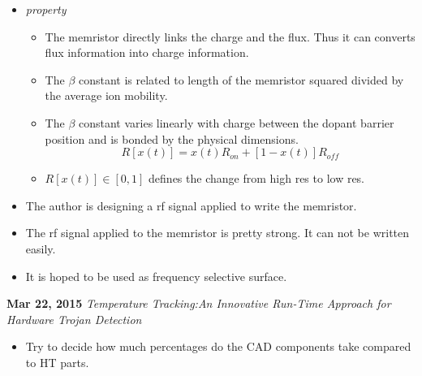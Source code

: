 \documentclass[]{article}
\begin{document}
\indent		\begin{itemize}
        \item \textit{property} 
            \begin{itemize}
                \item The memristor directly links the charge and the flux. Thus it can
                converts flux information into charge information.             
                \item The $\beta$ constant is related to length of the memristor squared
                divided by the average ion mobility.
                \item The $\beta$ constant varies linearly with charge between the
                dopant barrier position and is bonded by the physical dimensions.
                \begin{equation}
                    R[x(t)] = x(t)R_{on}+[1-x(t)]R_{off}
                \end{equation}
                \item $R[x(t)]\in[0,1]$ defines the change from high res to low
                res.
            \end{itemize}
        \item The author is designing a rf signal applied to write the
        memristor.
        \item The rf signal applied to the memristor is pretty strong. It can
        not be written easily.
        \item It is hoped to be used as frequency selective surface.

        \end{itemize}


\noindent \textbf{Mar 22, 2015}
\textit{Temperature Tracking:An Innovative Run-Time Approach for Hardware Trojan
    Detection}
\indent		\begin{itemize}
                \item Try to decide how much percentages do the CAD components take
                compared to HT parts.
            \end{itemize}
\end{document}
